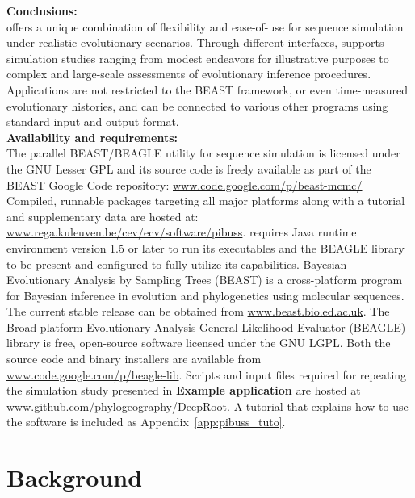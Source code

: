 \noindent
\textbf{Conclusions:} \\
{\bussname} offers a unique combination of flexibility and ease-of-use for sequence simulation under realistic evolutionary scenarios. 
Through different interfaces, {\bussname} supports simulation studies ranging from modest endeavors for illustrative purposes  to complex and large-scale assessments of evolutionary inference procedures.
Applications are not restricted to the BEAST framework, or even time-measured evolutionary histories, and {\bussname} can be connected to various other programs using standard input and output format. \\

\noindent
\textbf{Availability and requirements:} \\
The parallel BEAST/BEAGLE utility for sequence simulation is licensed under the GNU Lesser GPL and its source code is freely available as part of the BEAST Google Code repository: \url{www.code.google.com/p/beast-mcmc/}
Compiled, runnable packages targeting all major platforms along with a tutorial and supplementary data are hosted at:
\url{www.rega.kuleuven.be/cev/ecv/software/pibuss}.
{\bussname} requires Java runtime environment version 1.5 or later to run its executables and the BEAGLE library to be present and configured to fully utilize its capabilities.
Bayesian Evolutionary Analysis by Sampling Trees (BEAST) is a cross-platform program for Bayesian inference in evolution and phylogenetics using molecular sequences. 
The current stable release can be obtained from \url{www.beast.bio.ed.ac.uk}.
The Broad-platform Evolutionary Analysis General Likelihood Evaluator (BEAGLE) library is free, open-source software licensed under the GNU LGPL. Both the source code and binary installers are available from \url{www.code.google.com/p/beagle-lib}. 
Scripts and input files required for repeating the simulation study presented in {\bf{Example application}} are hosted at \url{www.github.com/phylogeography/DeepRoot}.
A tutorial that explains how to use the software is included as Appendix~\ref{app:pibuss_tuto}.

\section{Background}

